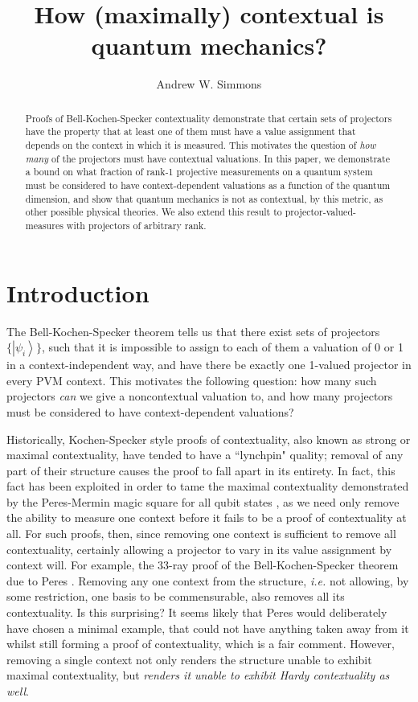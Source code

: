 \documentclass{amsart}
\theoremstyle{definition}
\newcommand{\ket}[1]{{\left\vert{#1}\right\rangle}}
\begin{document}
\title{How (maximally) contextual is quantum mechanics?}
\author{Andrew W. Simmons}
\address{Department of Physics, Imperial College London, SW7 2AZ.}
\begin{abstract}
Proofs of Bell-Kochen-Specker contextuality demonstrate that certain sets of projectors have the property that at least one of them must have a value assignment that depends on the context in which it is measured. This motivates the question of \emph{how many} of the projectors must have contextual valuations. In this paper, we demonstrate a bound on what fraction of rank-1 projective measurements on a quantum system must be considered to have context-dependent valuations as a function of the quantum dimension, and show that quantum mechanics is not as contextual, by this metric, as other possible physical theories. We also extend this result to projector-valued-measures with projectors of arbitrary rank.
\end{abstract}
\maketitle
\section{Introduction}

The Bell-Kochen-Specker theorem tells us that there exist sets of projectors $\{\ket{\psi_i}\}$, such that it is impossible to assign to each of them a valuation of 0 or 1 in a context-independent way, and have there be exactly one 1-valued projector in every PVM context. This motivates the following question: how many such projectors \emph{can} we give a noncontextual valuation to, and how many projectors must be considered to have context-dependent valuations?

Historically, Kochen-Specker style proofs of contextuality, also known as strong or maximal contextuality, have tended to have a ``lynchpin" quality; removal of any part of their structure causes the proof to fall apart in its entirety.  In fact, this fact has been exploited in order to tame the maximal contextuality demonstrated by the Peres-Mermin magic square for all qubit states \cite{Berm2016}, as we need only remove the ability to measure one context before it fails to be a proof of contextuality at all. For such proofs, then, since removing one context is sufficient to remove all contextuality, certainly allowing a projector to vary in its value assignment by context will. 
For example, the 33-ray proof of the Bell-Kochen-Specker theorem due to Peres \cite{Pere1991}. Removing any one context from the structure, \emph{i.e.} not allowing, by some restriction, one basis to be commensurable, also removes all its contextuality. Is this surprising? It seems likely that Peres would deliberately have chosen a minimal example, that could not have anything taken away from it whilst still forming a proof of contextuality, which is a fair comment. However, removing a single context not only renders the structure unable to exhibit maximal contextuality, but \emph{renders it unable to exhibit Hardy contextuality as well}.
\end{document}
